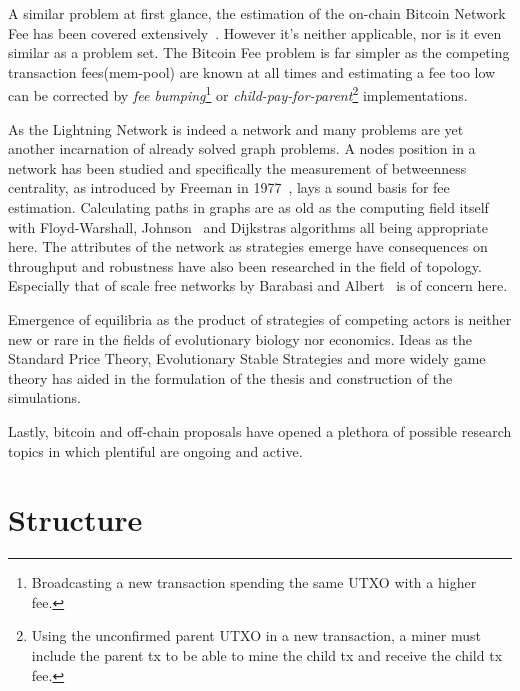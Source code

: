 	A similar problem at first glance, the estimation of the on-chain Bitcoin Network Fee has been covered extensively~\cite{mosterland:transaction:fee, houy:transaction:fee}. However it's neither applicable, nor is it even similar as a problem set. The Bitcoin Fee problem is far simpler as the competing transaction fees(mem-pool) are known at all times and estimating a fee too low can be corrected by \textit{fee bumping}\footnote{Broadcasting a new transaction spending the same \gls{UTXO} with a higher fee.} or \textit{child-pay-for-parent}\footnote{Using the unconfirmed parent UTXO in a new transaction, a miner must include the parent tx to be able to mine the child tx and receive the child tx fee.} implementations.
	
	As the Lightning Network is indeed a network and many problems are yet another incarnation of already solved graph problems. A nodes position in a network has been studied and specifically the measurement of \gls{betweenness centrality}, as introduced by Freeman in 1977~\cite{brandes:betweenness:centrality:algorithm}, lays a sound basis for fee estimation. Calculating paths in graphs are as old as the computing field itself with Floyd-Warshall, Johnson~\cite{johnson:shortest:path:sparse:network} and Dijkstras algorithms all being appropriate here. The attributes of the network as strategies emerge have consequences on throughput and robustness have also been researched in the field of topology. Especially that of scale free networks by Barabasi and Albert~\cite{barabasi:albert:emergent:scaling} is of concern here.
	
	Emergence of equilibria as the product of strategies of competing actors is neither new or rare in the fields of evolutionary biology nor economics. Ideas as the Standard Price Theory, Evolutionary Stable Strategies and more widely game theory has aided in the formulation of the thesis and construction of the simulations.
	
	Lastly, \gls{bitcoin} and off-chain proposals have opened a plethora of possible research topics in which plentiful are ongoing and active.  
	
	
\section{Structure}

